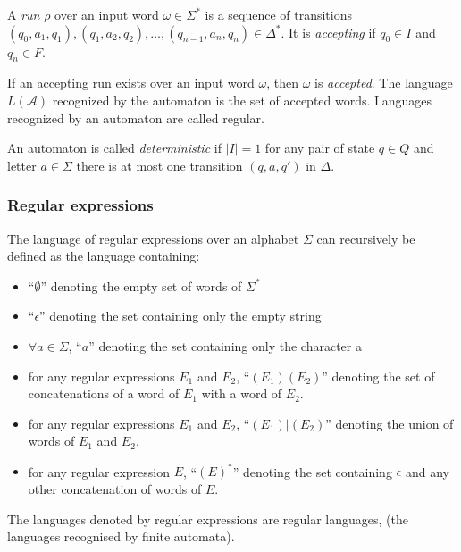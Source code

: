 \documentclass[12px]{article}
\begin{document}
        A \textit{run} $\rho$ over an input word $\omega \in \Sigma^*$ is a
        sequence of transitions $(q_0, a_1, q_1), (q_1, a_2, q_2), \ldots,
        (q_{n-1}, a_n, q_n) \in \Delta^*$. It is \textit{accepting} if $q_0 \in
        I$ and $q_n \in F$.

        If an accepting run exists over an input word $\omega$, then $\omega$
        is \textit{accepted}. The language $L(\mathcal{A})$ recognized by the
        automaton is the set of accepted words. Languages recognized by an
        automaton are called regular.

        An automaton is called \textit{deterministic} if $|I| = 1$ for any
        pair of state $q \in Q$ and letter $a \in \Sigma$ there is at most one
        transition $(q, a, q')$ in $\Delta$.

      \subsubsection{Regular expressions}%
        \label{sec:def:regex}

        The language of regular expressions over an alphabet $\Sigma$ can
        recursively be defined as the language containing:

        \begin{itemize}
          \item ``$\emptyset$'' denoting the empty set of words of $\Sigma^*$
          \item ``$\epsilon$'' denoting the set containing only the empty
            string
          \item $\forall a \in \Sigma$, ``$a$'' denoting the set containing
            only the character a
          \item for any regular expressions $E_1$ and $E_2$, ``$(E_1) (E_2)$''
            denoting the set of concatenations of a word of $E_1$ with a word
            of $E_2$.
          \item for any regular expressions $E_1$ and $E_2$, ``$(E_1)|(E_2)$''
            denoting the union of words of $E_1$ and $E_2$.
          \item for any regular expression $E$, ``${(E)}^*$'' denoting the set
            containing $\epsilon$ and any other concatenation of words of $E$.
        \end{itemize}


        The languages denoted by regular expressions are regular languages,
        (the languages recognised by finite automata).
\end{document}
